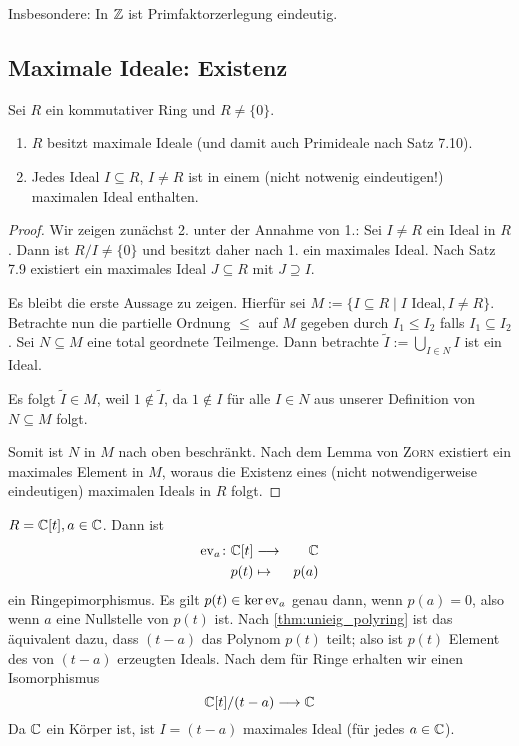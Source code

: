 \documentclass[12pt,a4paper]{scrartcl}
\begin{document}
\begin{bem}
	Insbesondere: In $\mathbb Z$ ist Primfaktorzerlegung \glqq eindeutig\grqq.
\end{bem}

\subsection{Maximale Ideale: Existenz}
\begin{satz}\label{thm:9.1}
	Sei $R$ ein kommutativer Ring %
	und $R \neq \{0\}$.
	\begin{enumerate}
		\item $R$ besitzt maximale Ideale (und damit auch Primideale nach Satz 7.10).
		\item Jedes Ideal $I\subseteq R$, $I \neq R$ ist in einem (nicht notwenig eindeutigen!) maximalen Ideal enthalten.
	\end{enumerate}
\end{satz}
\begin{proof}
	Wir zeigen zunächst 2. unter der Annahme von 1.: Sei $I\neq R$ ein Ideal in $R$. Dann ist $R/I \neq \{0\}$  und besitzt daher nach 1. ein maximales Ideal. Nach Satz 7.9 existiert ein maximales Ideal $J\subseteq R$ mit $J\supseteq I$.
	
	
	Es bleibt die erste Aussage zu zeigen. Hierfür sei $M := \{I\subseteq R\mid I\text{ Ideal}, I \neq R\}$. Betrachte nun die partielle Ordnung $\leq$ auf $M$ gegeben durch $I_1\leq I_2$ falls $I_1\subseteq I_2$. Sei $N\subseteq M$ eine total geordnete Teilmenge. Dann betrachte $\tilde{I} := \bigcup\limits_{I\in N} I$ ist ein Ideal.
	
	Es folgt $\tilde{I}\in M$, weil $1\notin \tilde{I}$, da $1\notin I$ für alle $ I\in N$ aus unserer Definition von $N\subseteq M$ folgt.
	
	Somit ist $N$ in $M$ nach oben beschränkt. Nach dem Lemma von \textsc{Zorn} existiert ein maximales Element in $M$, woraus die Existenz eines (nicht notwendigerweise eindeutigen) maximalen Ideals in $R$ folgt.
\end{proof}
\begin{bsp}
	$R = \mathbb C[t], a\in \mathbb C$. Dann ist
	\begin{eqnarray*}
		\operatorname{ev}_a\colon \mathbb C[t] & \longrightarrow & \mathbb C\\
		p(t) & \mapsto & p(a)
	\end{eqnarray*}
	ein Ringepimorphismus. Es gilt $p(t) \in \operatorname{ker}\operatorname{ev}_a$ genau dann, wenn $p(a) = 0$, also wenn $a$ eine Nullstelle von $p(t)$ ist. Nach \cref{thm:unieig_polyring} ist das äquivalent dazu, dass $(t-a)$ das Polynom $p(t)$ teilt; also ist $p(t)$ Element des von $(t-a)$ erzeugten Ideals. Nach dem  für Ringe erhalten wir einen Isomorphismus
	$$ \mathbb C[t]/(t-a) \longrightarrow \mathbb C$$
	Da $\mathbb C$ ein Körper ist, ist $I = (t-a)$ maximales Ideal (für jedes $a\in \mathbb C$).
\end{bsp}
\end{document}
